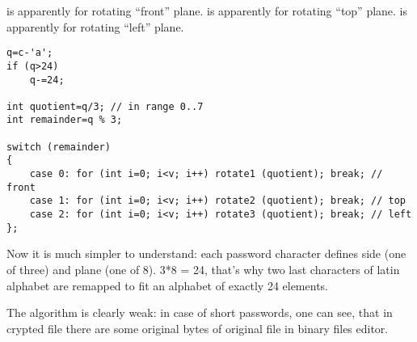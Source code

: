 { is apparently for rotating ``front'' plane. 
 is apparently for rotating ``top'' plane. 
 is apparently for rotating ``left'' plane.}


\begin{lstlisting}
q=c-'a';
if (q>24)
	q-=24;

int quotient=q/3; // in range 0..7
int remainder=q % 3;

switch (remainder)
{
    case 0: for (int i=0; i<v; i++) rotate1 (quotient); break; // front
    case 1: for (int i=0; i<v; i++) rotate2 (quotient); break; // top
    case 2: for (int i=0; i<v; i++) rotate3 (quotient); break; // left
};
\end{lstlisting}

{Now it is much simpler to understand: each password character defines side (one of three) and plane (one of 8). 
3*8 = 24, that's why two last characters of latin alphabet are remapped to fit an alphabet of exactly 
24 elements.}

{The algorithm is clearly weak: in case of short passwords, one can see, that in crypted file there are 
some original bytes of original file in binary files editor.}





